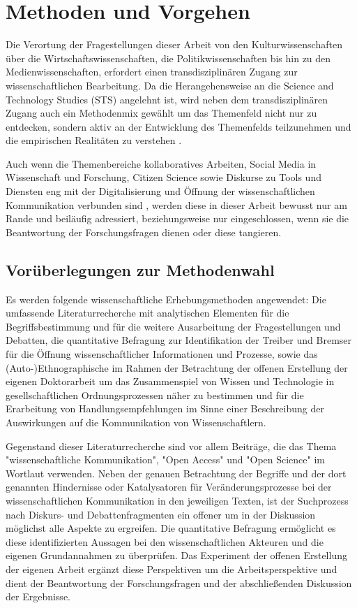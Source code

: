 \chapter{Methoden und Vorgehen}

Die Verortung der Fragestellungen dieser Arbeit von den Kulturwissenschaften über die Wirtschaftswissenschaften, die Politikwissenschaften bis hin zu den Medienwissenschaften, erfordert einen transdisziplinären Zugang zur wissenschaftlichen Bearbeitung. Da die Herangehensweise an die Science and Technology Studies (STS) angelehnt ist, wird neben dem transdisziplinären Zugang auch ein Methodenmix gewählt um das Themenfeld nicht nur zu entdecken, sondern aktiv an der Entwicklung des Themenfelds teilzunehmen \cite{MacKenzie_STS_1999} und die empirischen Realitäten zu verstehen \cite{kelty_2014_freedom}.

Auch wenn die Themenbereiche kollaboratives Arbeiten, Social Media in Wissenschaft und Forschung, Citizen Science sowie Diskurse zu Tools und Diensten eng mit der Digitalisierung und Öffnung der wissenschaftlichen Kommunikation verbunden sind \cite{eu_agenda_open_science_2015}, werden diese in dieser Arbeit bewusst nur am Rande und beiläufig adressiert, beziehungsweise nur eingeschlossen, wenn sie die Beantwortung der Forschungsfragen dienen oder diese tangieren.

\section{Vorüberlegungen zur Methodenwahl}

Es werden folgende wissenschaftliche Erhebungsmethoden angewendet: Die umfassende Literaturrecherche mit analytischen Elementen für die Begriffsbestimmung und für die weitere Ausarbeitung der Fragestellungen und Debatten, die quantitative Befragung zur Identifikation der Treiber und Bremser für die Öffnung wissenschaftlicher Informationen und Prozesse, sowie das (Auto-)Ethnographische im Rahmen der Betrachtung der offenen Erstellung der eigenen Doktorarbeit um das Zusammenspiel von Wissen und Technologie in gesellschaftlichen Ordnungsprozessen näher zu bestimmen und für die Erarbeitung von Handlungsempfehlungen im Sinne einer Beschreibung der Auswirkungen auf die Kommunikation von Wissenschaftlern.

Gegenstand dieser Literaturrecherche sind vor allem Beiträge, die das Thema "wissenschaftliche Kommunikation", "Open Access" und "Open Science" im Wortlaut verwenden. Neben der genauen Betrachtung der Begriffe und der dort genannten Hindernisse oder Katalysatoren für Veränderungsprozesse bei der wissenschaftlichen Kommunikation in den jeweiligen Texten, ist der Suchprozess nach Diskurs- und Debattenfragmenten ein offener um in der Diskussion möglichst alle Aspekte zu ergreifen. Die quantitative Befragung ermöglicht es diese identifizierten Aussagen bei den wissenschaftlichen Akteuren und die eigenen Grundannahmen zu überprüfen. Das Experiment der offenen Erstellung der eigenen Arbeit ergänzt diese Perspektiven um die Arbeitsperspektive und dient der Beantwortung der Forschungsfragen und der abschließenden Diskussion der Ergebnisse.

